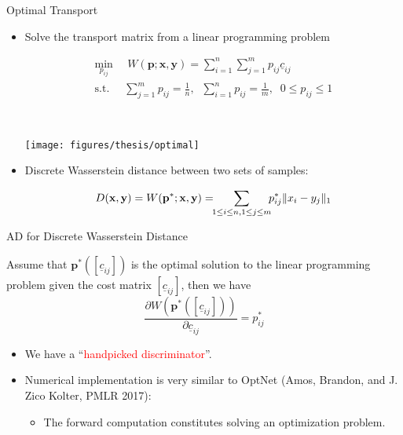 \documentclass[usenames,dvipsnames]{beamer}
\newcommand{\uc}{\underline{c}}
\newcommand{\by}{\mathbf{y}}
\begin{document}
\begin{frame}{Optimal Transport}
	\begin{itemize}
\item Solve the transport matrix from a linear programming problem 
\begin{minipage}{0.7\textwidth}
	\begin{equation*}
		\begin{aligned}
			\min_{p_{ij}} &\; W(\mathbf{p}; \mathbf{x}, \by) = \sum_{i=1}^n \sum_{j=1}^m p_{ij} \underline{c}_{ij} \\
			\mathrm{s.t.}\;\; & \sum_{j=1}^m p_{ij} = \frac{1}{n},\;\; \sum_{i=1}^n p_{ij} = \frac{1}{m},\;\; 0\leq p_{ij}\leq 1
		\end{aligned}
	\end{equation*}
\end{minipage}~
\begin{minipage}{0.3\textwidth}
	\texttt{[image: figures/thesis/optimal]}
\end{minipage}
\item Discrete Wasserstein distance between two sets of samples:

$$	D(\mathbf{x}, \by) = W(\mathbf{p}^*; \mathbf{x}, \by) = \hspace{-4pt} \sum_{1\leq i\leq n, 1\leq j\leq m} \hspace{-4pt} p^*_{ij} \|x_i-y_j\|_1$$


	\end{itemize}
\end{frame}


\begin{frame}{AD for Discrete Wasserstein Distance}
\begin{theorem}
	Assume that $\mathbf{p}^*([\uc_{ij}])$ is the optimal solution to the linear programming problem given the cost matrix $[\uc_{ij}]$, then we have 
	\begin{equation*}
		\frac{\partial W(\mathbf{p}^*([\uc_{ij}]))}{\partial \uc_{ij}} = p^*_{ij}
	\end{equation*}
\end{theorem}

\begin{itemize}
\item We have a ``\textcolor{red}{handpicked discriminator}''. 
\item Numerical implementation is very similar to OptNet (Amos, Brandon, and J. Zico Kolter, PMLR 2017):
\begin{itemize}
\item The forward computation constitutes solving an optimization problem. 
\end{itemize}
\end{itemize}
\end{frame}
\end{document}
